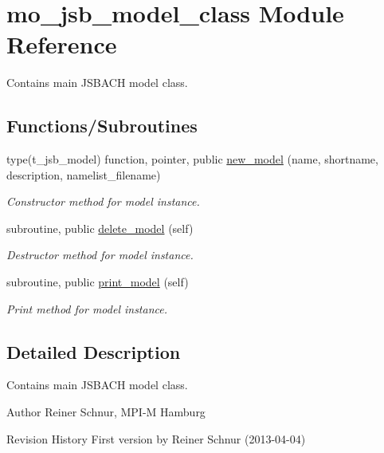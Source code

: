 \hypertarget{namespacemo__jsb__model__class}{}\section{mo\+\_\+jsb\+\_\+model\+\_\+class Module Reference}
\label{namespacemo__jsb__model__class}


Contains main J\+S\+B\+A\+C\+H model class.  


\subsection*{Functions/\+Subroutines}
\begin{DoxyCompactItemize}
\item 
type(t\+\_\+jsb\+\_\+model) function, pointer, public \hyperlink{namespacemo__jsb__model__class_adf5b91c2a2a066c645b083ed656d2a79}{new\+\_\+model} (name, shortname, description, namelist\+\_\+filename)
\begin{DoxyCompactList}\small\item\em Constructor method for model instance. \end{DoxyCompactList}\item 
subroutine, public \hyperlink{namespacemo__jsb__model__class_a82752ae5f33d1ce51253ab6bb3dbe776}{delete\+\_\+model} (self)
\begin{DoxyCompactList}\small\item\em Destructor method for model instance. \end{DoxyCompactList}\item 
subroutine, public \hyperlink{namespacemo__jsb__model__class_aeff5c6eb74d03881233ad31085269d5e}{print\+\_\+model} (self)
\begin{DoxyCompactList}\small\item\em Print method for model instance. \end{DoxyCompactList}\end{DoxyCompactItemize}


\subsection{Detailed Description}
Contains main J\+S\+B\+A\+C\+H model class. 

\begin{DoxyAuthor}{Author}
Reiner Schnur, M\+P\+I-\/\+M Hamburg
\end{DoxyAuthor}
\begin{DoxyParagraph}{Revision History}
First version by Reiner Schnur (2013-\/04-\/04) 
\end{DoxyParagraph}


